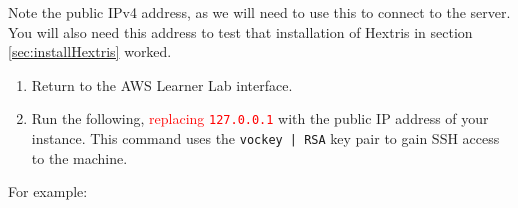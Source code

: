\documentclass{csse4400}
\begin{document}
\noindent
Note the public IPv4 address, as we will need to use this to connect to the server.
You will also need this address to test that installation of Hextris in section \ref{sec:installHextris} worked.

\begin{enumerate}
    \item Return to the AWS Learner Lab interface.
    \item Run the following, \textcolor{red}{replacing \texttt{127.0.0.1}} with the public IP address of your instance.
          This command uses the \texttt{vockey | RSA} key pair to gain SSH access to the machine.
\end{enumerate}

\noindent
For example:
\hspace{5mm}

%
%
%
\end{document}
